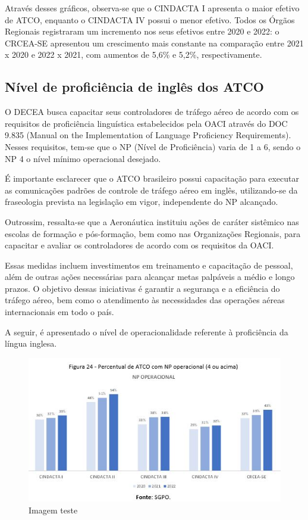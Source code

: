 \documentclass[
]{book}
\begin{document}
Através desses gráficos, observa-se que o CINDACTA I apresenta o maior efetivo de ATCO, enquanto o CINDACTA IV possui o menor efetivo. Todos os Órgãos Regionais registraram um incremento nos seus efetivos entre 2020 e 2022: o CRCEA-SE apresentou um crescimento mais constante na comparação entre 2021 x 2020 e 2022 x 2021, com aumentos de 5,6\% e 5,2\%, respectivamente.

\hypertarget{nuxedvel-de-proficiuxeancia-de-ingluxeas-dos-atco}{%
\subsection{Nível de proficiência de inglês dos ATCO}\label{nuxedvel-de-proficiuxeancia-de-ingluxeas-dos-atco}}

O DECEA busca capacitar seus controladores de tráfego aéreo de acordo com os requisitos de proficiência linguística estabelecidos pela OACI através do DOC 9.835 (Manual on the Implementation of Language Proficiency Requirements). Nesses requisitos, tem-se que o NP (Nível de Proficiência) varia de 1 a 6, sendo o NP 4 o nível mínimo operacional desejado.

É importante esclarecer que o ATCO brasileiro possui capacitação para executar as comunicações padrões de controle de tráfego aéreo em inglês, utilizando-se da fraseologia prevista na legislação em vigor, independente do NP alcançado.

Outrossim, ressalta-se que a Aeronáutica instituiu ações de caráter sistêmico nas escolas de formação e pós-formação, bem como nas Organizações Regionais, para capacitar e avaliar os controladores de acordo com os requisitos da OACI.

Essas medidas incluem investimentos em treinamento e capacitação de pessoal, além de outras ações necessárias para alcançar metas palpáveis a médio e longo prazos. O objetivo dessas iniciativas é garantir a segurança e a eficiência do tráfego aéreo, bem como o atendimento às necessidades das operações aéreas internacionais em todo o país.

A seguir, é apresentado o nível de operacionalidade referente à proficiência da língua inglesa.

\begin{figure}
\centering
\includegraphics{imagens/fig27.jpg}
\caption{Imagem teste}
\end{figure}
\end{document}
